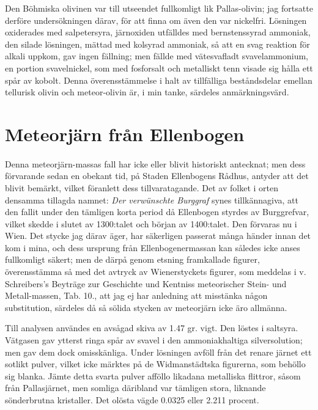 \documentclass[a4paper, 12pt, oneside, swedish]{article}
\begin{document}
Den Böhmiska olivinen var till utseendet fullkomligt lik Pallas-olivin; jag fortsatte derföre undersökningen därav, för att finna om även den var nickelfri. Lösningen oxiderades med salpetersyra, järnoxiden utfälldes med bernstenssyrad ammoniak, den silade lösningen, mättad med kolsyrad ammoniak, så att en svag reaktion för alkali uppkom, gav ingen fällning; men fällde med vätesvafladt svavelammonium, en portion svavelnickel, som med fosforsalt och metalliskt tenn visade sig hålla ett spår av kobolt. Denna överensstämmelse i halt av tillfälliga beståndsdelar emellan tellurisk olivin och meteor-olivin är, i min tanke, särdeles anmärkningsvärd.
\clearpage
\section{Meteorjärn från Ellenbogen}
\paragraph{}
Denna meteorjärn-massas fall har icke eller blivit historiskt antecknat; men dess förvarande sedan en obekant tid, på Staden Ellenbogens Rådhus, antyder att det blivit bemärkt, vilket föranlett dess tillvaratagande. Det av folket i orten densamma tillagda namnet: \emph{Der verwünschte Burggraf} synes tillkännagiva, att den fallit under den tämligen korta period då Ellenbogen styrdes av Burggrefvar, vilket skedde i slutet av 1300:talet och början av 1400:talet. Den förvaras nu i Wien. Det stycke jag därav äger, har säkerligen passerat många händer innan det kom i mina, och dess ursprung från Ellenbogenermassan kan således icke anses fullkomligt säkert; men de därpå genom etsning framkallade figurer, överensstämma så med det avtryck av Wienerstyckets figurer, som meddelas i v. Schreibers's Beyträge zur Geschichte und Kentniss meteorischer Stein- und Metall-massen, Tab. 10., att jag ej har anledning att misstänka någon substitution, särdeles då så sölida stycken av meteorjärn icke äro allmänna.

Till analysen användes en avsågad skiva av 1.47 gr. vigt. Den löstes i saltsyra. Vätgasen gav ytterst ringa spår av svavel i den ammoniakhaltiga silversolution; men gav dem dock omisskänliga. Under lösningen avföll från det renare järnet ett sotlikt pulver, vilket icke märktes på de Widmanstädtska figurerna, som behöllo sig blanka. Jämte detta svarta pulver afföllo likadana metalliska flittror, såsom från Pallasjärnet, men somliga däribland var tämligen stora, liknande sönderbrutna kristaller. Det olösta vägde 0.0325 eller 2.211 procent.
\end{document}
